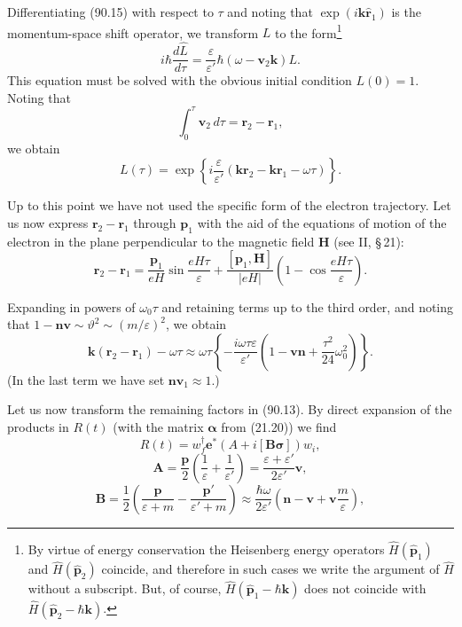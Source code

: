 Differentiating (90.15) with respect to $\tau$ and noting that $\exp(i\mathbf{k}\hat{\mathbf{r}}_1)$ is the momentum-space shift operator, we transform $L$ to the form\footnote{By virtue of energy conservation the Heisenberg energy operators $\hat{H}(\hat{\mathbf{p}}_1)$ and $\hat{H}(\hat{\mathbf{p}}_2)$ coincide, and therefore in such cases we write the argument of $\hat{H}$ without a subscript. But, of course, $\hat{H}(\hat{\mathbf{p}}_1 - \hbar\mathbf{k})$ does not coincide with $\hat{H}(\hat{\mathbf{p}}_2 - \hbar\mathbf{k})$.}
\begin{equation}
i\hbar\frac{d\hat{L}}{d\tau} = \frac{\varepsilon}{\varepsilon'}\hbar(\omega - \mathbf{v}_2\mathbf{k})L.
\label{eq:90.17}
\end{equation}
This equation must be solved with the obvious initial condition $L(0) = 1$. Noting that
\[
\int_0^\tau \mathbf{v}_2\,d\tau = \mathbf{r}_2 - \mathbf{r}_1,
\]
we obtain
\begin{equation}
L(\tau) = \exp\!\left\{i\frac{\varepsilon}{\varepsilon'}(\mathbf{kr}_2 - \mathbf{kr}_1 - \omega\tau)\right\}.
\label{eq:90.18}
\end{equation}


Up to this point we have not used the specific form of the electron trajectory. Let us now express $\mathbf{r}_2 - \mathbf{r}_1$ through $\mathbf{p}_1$ with the aid of the equations of motion of the electron in the plane perpendicular to the magnetic field $\mathbf{H}$ (see II, \S\,21):
\[
\mathbf{r}_2 - \mathbf{r}_1 = \frac{\mathbf{p}_1}{eH}\sin\frac{eH\tau}{\varepsilon} + \frac{[\mathbf{p}_1,\mathbf{H}]}{|eH|}\left(1 - \cos\frac{eH\tau}{\varepsilon}\right).
\]

Expanding in powers of $\omega_0\tau$ and retaining terms up to the third order, and noting that $1 - \mathbf{nv} \sim \vartheta^2 \sim (m/\varepsilon)^2$, we obtain
\begin{equation}
\mathbf{k}(\mathbf{r}_2 - \mathbf{r}_1) - \omega\tau \approx \omega\tau\left\{-\frac{i\omega\tau\varepsilon}{\varepsilon'}\left(1 - \mathbf{vn} + \frac{\tau^2}{24}\omega_0^2\right)\right\}.
\label{eq:90.19}
\end{equation}
(In the last term we have set $\mathbf{nv}_1 \approx 1$.)

Let us now transform the remaining factors in (90.13). By direct expansion of the products in $R(t)$ (with the matrix $\boldsymbol{\alpha}$ from (21.20)) we find
\[
R(t) = w_f^\dagger\mathbf{e}^*(A + i[\mathbf{B}\boldsymbol{\sigma}])w_i,
\]
\begin{equation}
\mathbf{A} = \frac{\mathbf{p}}{2}\left(\frac{1}{\varepsilon} + \frac{1}{\varepsilon'}\right) = \frac{\varepsilon+\varepsilon'}{2\varepsilon'}\mathbf{v},
\label{eq:90.20}
\end{equation}
\[
\mathbf{B} = \frac{1}{2}\left(\frac{\mathbf{p}}{\varepsilon+m} - \frac{\mathbf{p}'}{\varepsilon'+m}\right) \approx \frac{\hbar\omega}{2\varepsilon'}\left(\mathbf{n} - \mathbf{v} + \mathbf{v}\frac{m}{\varepsilon}\right),
\]

